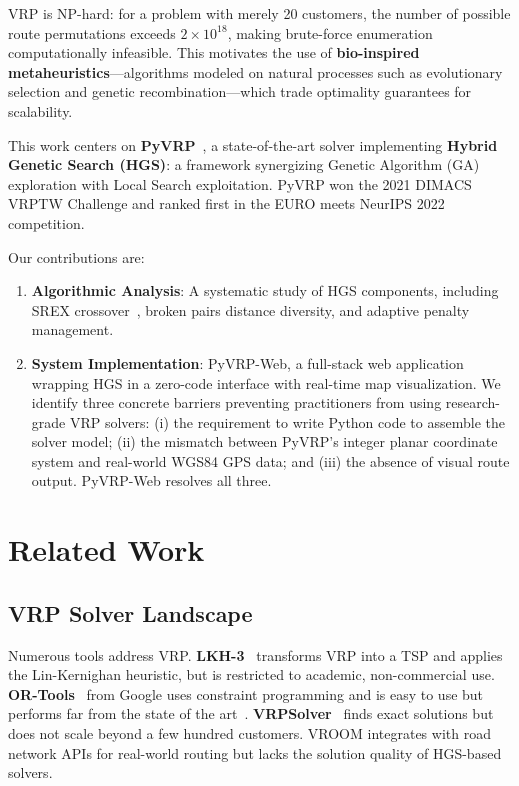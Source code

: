 \documentclass[conference]{IEEEtran}
\begin{document}
VRP is NP-hard: for a problem with merely 20 customers, the number of
possible route permutations exceeds $2\times10^{18}$, making brute-force
enumeration computationally infeasible. This motivates the use of
\textbf{bio-inspired metaheuristics}---algorithms modeled on natural
processes such as evolutionary selection and genetic recombination---which
trade optimality guarantees for scalability.

This work centers on \textbf{PyVRP}~\cite{wouda2024pyvrp}, a
state-of-the-art solver implementing \textbf{Hybrid Genetic Search (HGS)}:
a framework synergizing Genetic Algorithm (GA) exploration with Local Search
exploitation. PyVRP won the 2021 DIMACS VRPTW Challenge and ranked first in
the EURO meets NeurIPS 2022 competition.

Our contributions are:
\begin{enumerate}
  \item \textbf{Algorithmic Analysis}: A systematic study of HGS components,
    including SREX crossover~\cite{nagata2010memetic}, broken pairs distance
    diversity, and adaptive penalty management.
  \item \textbf{System Implementation}: PyVRP-Web, a full-stack web
    application wrapping HGS in a zero-code interface with real-time map
    visualization. We identify three concrete barriers preventing practitioners
    from using research-grade VRP solvers: (i) the requirement to write Python
    code to assemble the solver model; (ii) the mismatch between PyVRP's
    integer planar coordinate system and real-world WGS84 GPS data; and
    (iii) the absence of visual route output. PyVRP-Web resolves all three.
\end{enumerate}

\section{Related Work}

\subsection{VRP Solver Landscape}

Numerous tools address VRP. \textbf{LKH-3}~\cite{helsgaun2017extension}
transforms VRP into a TSP and applies the Lin-Kernighan heuristic, but is
restricted to academic, non-commercial use. \textbf{OR-Tools}~\cite{ortools}
from Google uses constraint programming and is easy to use but
performs far from the state of the art~\cite{wouda2024pyvrp}.
\textbf{VRPSolver}~\cite{pessoa2020generic} finds exact solutions but
does not scale beyond a few hundred customers. VROOM integrates with road
network APIs for real-world routing but lacks the solution quality of
HGS-based solvers.
\end{document}
